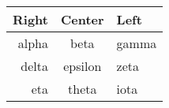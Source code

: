 \documentclass[12pt]{article}
\begin{document}
	\begin{tabular}{|r|c|l|}
		\hline
		Right  &  Center  &  Left\\
		\hline
		alpha&beta&gamma\\
		\hline
		delta&epsilon&zeta\\
		eta&theta&iota\\
		\hline
	\end{tabular}
\end{document}
